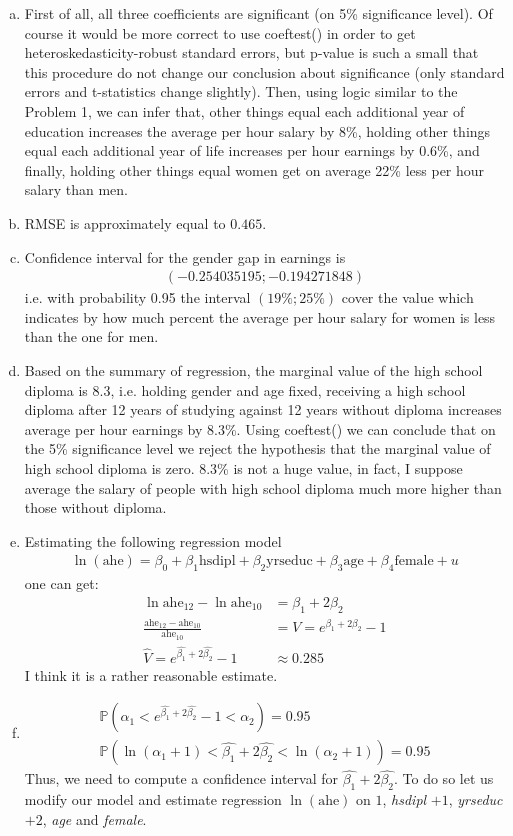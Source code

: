 \documentclass[a4paper]{article}
\newcommand{\prob}{\mathbb{P}}
\begin{document}
\begin{enumerate}[(a)]
	\item First of all, all three coefficients are significant (on 5\% significance level). Of course it would be more correct to use coeftest() in order to get heteroskedasticity-robust standard errors, but p-value is such a small that this procedure do not change our conclusion about significance (only standard errors and t-statistics change slightly). Then, using logic similar to the Problem 1, we can infer that, other things equal each additional year of education increases the average per hour salary by 8\%, holding other things equal each additional year of life increases per hour earnings by 0.6\%, and finally, holding other things equal women get on average 22\% less per hour salary than men.
	\item RMSE is approximately equal to $0.465$.
	\item Confidence interval for the gender gap in earnings is
	\begin{align*}
	(-0.254035195; -0.194271848)
	\end{align*}
	i.e. with probability 0.95 the interval $(19\%; 25\%)$ cover the value which indicates by how much percent the average per hour salary for women is less than the one for men.
	\item Based on the summary of regression, the marginal value of the high school diploma is 8.3, i.e. holding gender and age fixed, receiving a high school diploma after 12 years of studying against 12 years without diploma increases average per hour earnings by 8.3\%. Using coeftest() we can conclude that on the 5\% significance level we reject the hypothesis that the marginal value of high school diploma is zero. 8.3\% is not a huge value, in fact, I suppose average the salary of people with high school diploma much more higher than those without diploma.
	\item 
	Estimating the following regression model
	\begin{align*}
	\ln(\text{ahe}) = \beta_0 + \beta_1 \text{hsdipl} + \beta_2 \text{yrseduc} + \beta_3 \text{age} + \beta_4\text{female} + u
	\end{align*}
	one can get:
	\begin{align*}
	\ln \text{ahe}_{12} - \ln \text{ahe}_{10} &= \beta_1 + 2 \beta_2\\
	\frac{\text{ahe}_{12} - \text{ahe}_{10}}{\text{ahe}_{10}} &= V = e^{\beta_1 + 2\beta_2} - 1 \\
	\hat{V} = e^{\hat{\beta_1} + 2\hat{\beta_2}} - 1 &\approx 0.285
\end{align*}
I think it is a rather reasonable estimate.
\item 
\begin{align*}
\prob (\alpha_1 < e^{\hat{\beta_1} + 2 \hat{\beta_2}} - 1 < \alpha_{2}) = 0.95\\
\prob (\ln(\alpha_1 + 1) < \hat{\beta_1} + 2\hat{\beta_2} < \ln(\alpha_2 +1)) = 0.95
\end{align*}
Thus, we need to compute a confidence interval for $\hat{\beta_1} + 2 \hat{\beta_2}$. To do so let us modify our model and estimate regression $\ln( \text{ahe})$ on $1$, \textit{hsdipl } $+ 1$, \textit{yrseduc } $+2$, \textit{age} and \textit{female}.
\end{enumerate}
\end{document}
